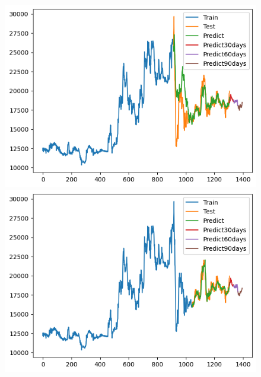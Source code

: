 \begin{figure}[H]
\begin{minipage}{0.15\textwidth}
    \includegraphics[width=1\textwidth]{resources/chapter-5/newdata1/result/EIB_NBeats_7-3.png}
    \end{minipage}
    \hfill
    \begin{minipage}{0.15\textwidth}
    \centering
    \includegraphics[width=1\textwidth]{resources/chapter-5/newdata1/result/EIB_NBeats_8-2.png}
    \end{minipage}
    \hfill
        \begin{minipage}{0.15\textwidth}
    \centering

\end{minipage}
\end{figure}
